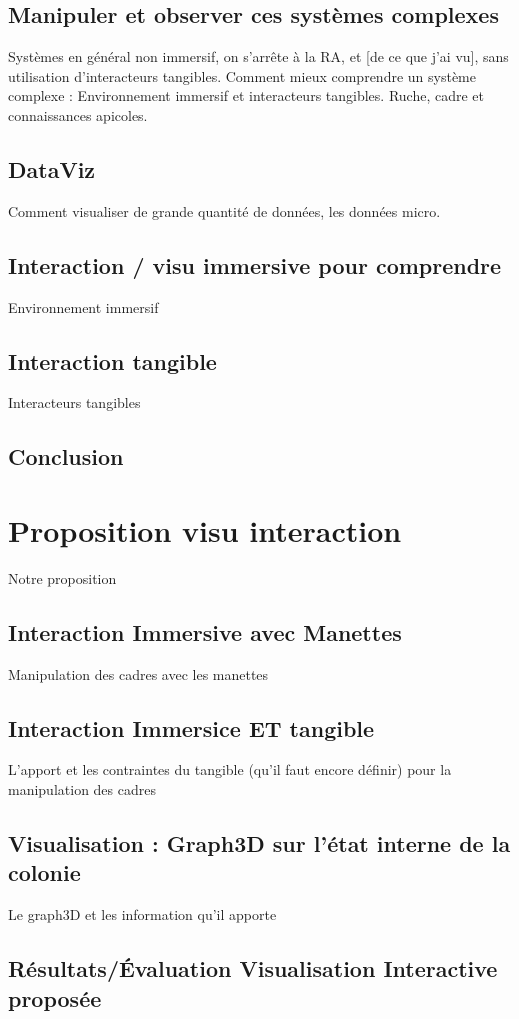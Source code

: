 \documentclass[11pt,a4paper]{report}
\begin{document}
	\section{Manipuler et observer ces systèmes complexes}
		Systèmes en général non immersif, on s'arrête à la RA, et [de ce que j'ai vu], sans utilisation d'interacteurs tangibles.
	Comment mieux comprendre un système complexe : Environnement immersif et interacteurs tangibles. Ruche, cadre et connaissances apicoles.
	\section{DataViz}
		Comment visualiser de grande quantité de données, les données micro.
	\section{Interaction / visu immersive pour comprendre}
		Environnement immersif
	\section{Interaction tangible}
		Interacteurs tangibles
		
			
	\section*{Conclusion}
		
		
		
		
\chapter{Proposition visu interaction}
	Notre proposition
	\section{Interaction Immersive avec Manettes}
		Manipulation des cadres avec les manettes
	\section{Interaction Immersice ET tangible}
		L'apport et les contraintes du tangible (qu'il faut encore définir) pour la manipulation des cadres
	\section{Visualisation : Graph3D sur l'état interne de la colonie}
		Le graph3D et les information qu'il apporte
	\section{Résultats/Évaluation Visualisation Interactive proposée}
	
\end{document}
